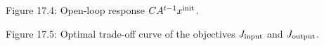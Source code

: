 
Figure 17.4: Open-loop response \(CA^{t-1}x^{\rm init}\).

Figure 17.5: Optimal trade-off curve of the objectives \(J_{\rm input}\) and \(J_{\rm output}\).

 